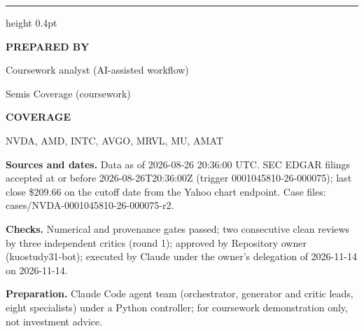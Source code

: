 \documentclass[a4paper,10pt]{article}
\newcommand{\DataDate}{2026-08-26 20:36:00 UTC}
\newcommand{\TeamName}{Semis Coverage (coursework)}
\newcommand{\ReportAuthor}{Coursework analyst (AI-assisted workflow)}
\newcommand{\Coverage}{NVDA, AMD, INTC, AVGO, MRVL, MU, AMAT}
\begin{document}
\par\vfill

{\color{MemoRule}\hrule height 0.4pt}\medskip
\begin{minipage}[t]{0.36\textwidth}
\vspace{0pt}\small
\setlength{\parskip}{3pt}
\textbf{PREPARED BY}\par\ReportAuthor\par\TeamName\par
\medskip\textbf{COVERAGE}\par\Coverage
\end{minipage}\hfill
\begin{minipage}[t]{0.60\textwidth}
\vspace{0pt}\footnotesize
\setlength{\parskip}{3pt}
\textbf{Sources and dates.} Data as of \DataDate.
SEC EDGAR filings accepted at or before 2026-08-26T20:36:00Z (trigger 0001045810-26-000075); last close \$209.66 on the cutoff date from the Yahoo chart endpoint. Case files: cases/NVDA-0001045810-26-000075-r2.

\textbf{Checks.} Numerical and provenance gates passed; two consecutive clean reviews by three independent critics (round 1); approved by Repository owner (kuostudy31-bot); executed by Claude under the owner's delegation of 2026-11-14 on 2026-11-14.

\textbf{Preparation.} Claude Code agent team (orchestrator, generator and critic leads, eight specialists) under a Python controller; for coursework demonstration only, not investment advice.
\end{minipage}
\end{document}
